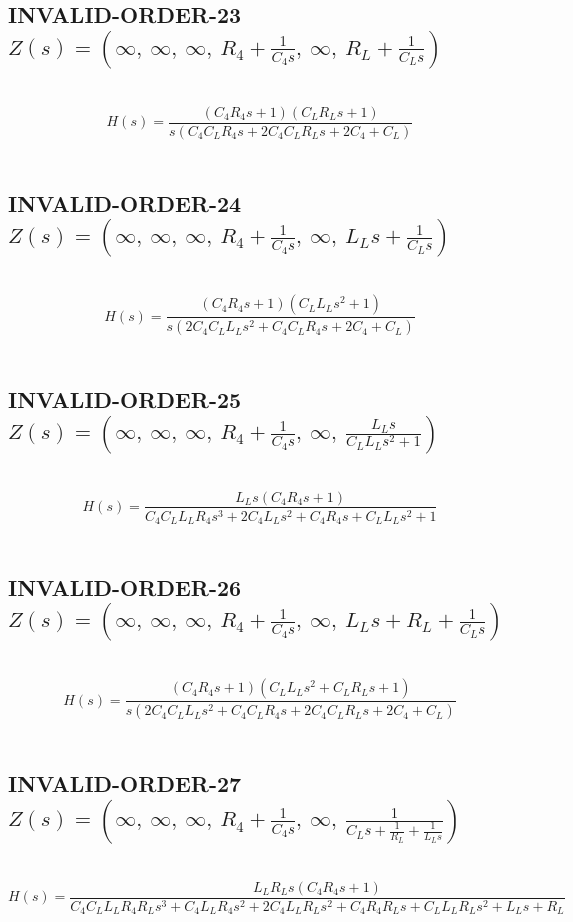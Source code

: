 \documentclass{article}
\begin{document}
\subsection{INVALID-ORDER-23 $Z(s) = \left( \infty, \  \infty, \  \infty, \  R_{4} + \frac{1}{C_{4} s}, \  \infty, \  R_{L} + \frac{1}{C_{L} s}\right)$ } \ 
\textbf{\[H(s) = \frac{\left(C_{4} R_{4} s + 1\right) \left(C_{L} R_{L} s + 1\right)}{s \left(C_{4} C_{L} R_{4} s + 2 C_{4} C_{L} R_{L} s + 2 C_{4} + C_{L}\right)}\] } \ 
\subsection{INVALID-ORDER-24 $Z(s) = \left( \infty, \  \infty, \  \infty, \  R_{4} + \frac{1}{C_{4} s}, \  \infty, \  L_{L} s + \frac{1}{C_{L} s}\right)$ } \ 
\textbf{\[H(s) = \frac{\left(C_{4} R_{4} s + 1\right) \left(C_{L} L_{L} s^{2} + 1\right)}{s \left(2 C_{4} C_{L} L_{L} s^{2} + C_{4} C_{L} R_{4} s + 2 C_{4} + C_{L}\right)}\] } \ 
\subsection{INVALID-ORDER-25 $Z(s) = \left( \infty, \  \infty, \  \infty, \  R_{4} + \frac{1}{C_{4} s}, \  \infty, \  \frac{L_{L} s}{C_{L} L_{L} s^{2} + 1}\right)$ } \ 
\textbf{\[H(s) = \frac{L_{L} s \left(C_{4} R_{4} s + 1\right)}{C_{4} C_{L} L_{L} R_{4} s^{3} + 2 C_{4} L_{L} s^{2} + C_{4} R_{4} s + C_{L} L_{L} s^{2} + 1}\] } \ 
\subsection{INVALID-ORDER-26 $Z(s) = \left( \infty, \  \infty, \  \infty, \  R_{4} + \frac{1}{C_{4} s}, \  \infty, \  L_{L} s + R_{L} + \frac{1}{C_{L} s}\right)$ } \ 
\textbf{\[H(s) = \frac{\left(C_{4} R_{4} s + 1\right) \left(C_{L} L_{L} s^{2} + C_{L} R_{L} s + 1\right)}{s \left(2 C_{4} C_{L} L_{L} s^{2} + C_{4} C_{L} R_{4} s + 2 C_{4} C_{L} R_{L} s + 2 C_{4} + C_{L}\right)}\] } \ 
\subsection{INVALID-ORDER-27 $Z(s) = \left( \infty, \  \infty, \  \infty, \  R_{4} + \frac{1}{C_{4} s}, \  \infty, \  \frac{1}{C_{L} s + \frac{1}{R_{L}} + \frac{1}{L_{L} s}}\right)$ } \ 
\textbf{\[H(s) = \frac{L_{L} R_{L} s \left(C_{4} R_{4} s + 1\right)}{C_{4} C_{L} L_{L} R_{4} R_{L} s^{3} + C_{4} L_{L} R_{4} s^{2} + 2 C_{4} L_{L} R_{L} s^{2} + C_{4} R_{4} R_{L} s + C_{L} L_{L} R_{L} s^{2} + L_{L} s + R_{L}}\] } \ 
\end{document}

